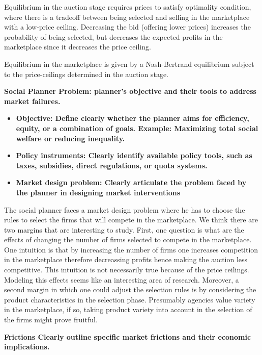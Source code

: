\documentclass[12pt]{article}
\theoremstyle{plain}
\theoremstyle{plain}
\begin{document}
Equilibrium in the auction stage requires prices to satisfy optimality condition, where there is a tradeoff between being selected and selling in the marketplace with a low-price ceiling. Decreasing the bid (offering lower prices) increases the probability of being selected, but decreases the expected profits in the marketplace since it decreases the price ceiling. 

Equilibrium in the marketplace is given by a Nash-Bertrand equilibrium subject to the price-ceilings determined in the auction stage. 



\textbf{Social Planner Problem:   planner’s objective and their tools to address market failures.}

\begin{itemize}
    \item \textbf{Objective: Define clearly whether the planner aims for efficiency, equity, or a combination of goals. Example: Maximizing total social welfare or reducing inequality.}

    \item \textbf{Policy instruments: Clearly identify available policy tools, such as taxes, subsidies, direct regulations, or quota systems.}

    \item \textbf{Market design problem: Clearly articulate the problem faced by the planner in designing market interventions}
\end{itemize}
 
The social planner faces a market design problem where he has to choose the rules to select the firms that will compete in the marketplace.  We think there are two margins that are interesting to study. 
First,  one question is what are the effects of changing the number of firms selected to compete in the marketplace. One intuition is that by increasing the number of firms one increases competition in the marketplace therefore decreassing profits hence making the auction less competitive. This intuition is not necessarily true because of the price ceilings. Modeling this effects seems like an interesting area of research. Moreover, a second margin in which one could adjust the selection rules is by considering the product characteristics in the selection phase. Presumably agencies value variety in the marketplace, if so, taking product variety into account in the selection of the firms might prove fruitful. 

    

 \textbf{Frictions Clearly outline specific market frictions and their economic implications.}
\end{document}
